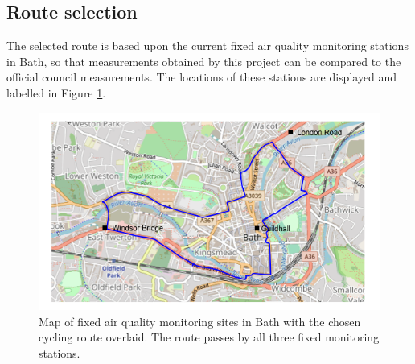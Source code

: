 \documentclass[11pt]{report}
\begin{document}
\subsection{Route selection} \label{route_selection}

The selected route is based upon the current fixed air quality monitoring stations in Bath, so that measurements obtained by this project can be compared to the official council measurements. The locations of these stations are displayed and labelled in Figure \ref{cycling_route}.



\begin{figure}[!tb]
  \centering
  \includegraphics[width=0.7\linewidth]{cycling_route}
  \caption[Cycling route.]{Map of fixed air quality monitoring sites in Bath with the chosen cycling route overlaid. The route passes by all three fixed monitoring stations.}
  \label{cycling_route}
\end{figure}

\end{document}
